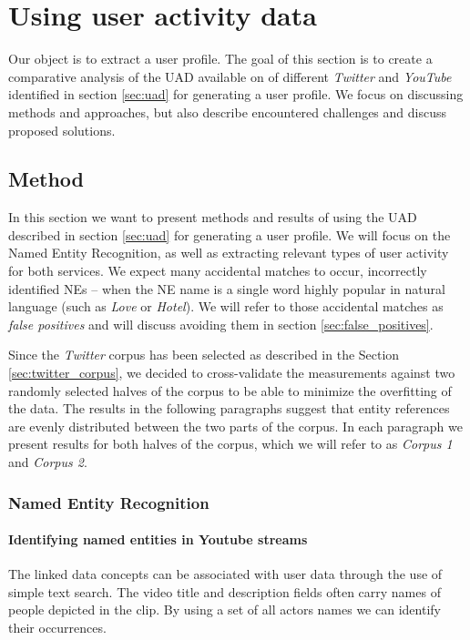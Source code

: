 \section{Using user activity data}
\label{sec:usage_uad}

Our object is to extract a user profile. The goal of this section is to create a comparative analysis of the UAD
available on of different \textit{Twitter} and \textit{YouTube} identified in section \ref{sec:uad} for generating
a user profile. We focus on discussing methods and approaches, but also describe encountered challenges and discuss
proposed solutions.

\subsection{Method}
In this section we want to present methods and results of using the UAD described in section \ref{sec:uad} for
generating a user profile. We will focus on the Named Entity Recognition, as well as extracting relevant types
of user activity for both services. We expect many accidental matches to occur, \ie incorrectly identified NEs
-- when the NE name is a single word highly popular in natural language (such as \textit{Love} or \textit{Hotel}).
We will refer to those accidental matches as \textit{false positives} and will discuss avoiding them in section
\ref{sec:false_positives}.

Since the \textit{Twitter} corpus has been selected as described in the Section \ref{sec:twitter_corpus},
we decided to cross-validate the measurements against two randomly selected halves of the corpus
to be able to minimize the overfitting of the data. The results in the following paragraphs suggest
that entity references are evenly distributed between the two parts of the corpus. In each paragraph we
present results for both halves of the corpus, which we will refer to as \textit{Corpus 1} and
\textit{Corpus 2}.

\subsubsection{Named Entity Recognition}
\label{sec:ner}

\paragraph{Identifying named entities in Youtube streams}
The linked data concepts can be associated with user data through the use of
simple text search. The video title and description fields often carry names
of people depicted in the clip. By using a set of all actors names we can
identify their occurrences.

